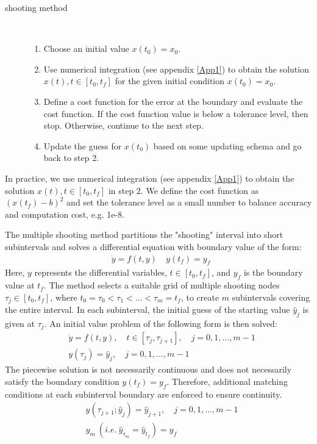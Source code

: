\documentclass  [
  paper    = a4,
  BCOR     = 10mm,
  twoside,
  fontsize = 12pt,
  fleqn,
  toc      = bibnumbered,
  toc      = listofnumbered,
  numbers  = noendperiod,
  headings = normal,
  listof   = leveldown,
  version  = 3.03
]                                       {scrreprt}
\newcommand{\<}{\langle}
\renewcommand{\>}{\rangle}
\begin{document}
\begin{description}
	\item[shooting method] \
	\begin{enumerate}
		\item Choose an initial value $x(t_0)=x_0$.
		\item Use numerical integration (see appendix \ref{App1}) to obtain the solution $x(t), t \in [t_0, t_f]$ for the given initial condition $x(t_0)=x_0$.
		\item Define a cost function for the error at the boundary and evaluate the cost function. If the cost function value is below a tolerance level, then stop. Otherwise, continue to the next step.
		\item Update the guess for $x(t_0)$ based on some updating schema and go back to step 2.
	\end{enumerate}
\end{description}
In practice, we use numerical integration (see appendix \ref{App1}) to obtain the solution $x(t), t \in [t_0, t_f]$ in step 2. We define the cost function as $(x(t_f)-b)^2$ and set the tolerance level as a small number to balance accuracy and computation cost, e.g. 1e-8.

The multiple shooting method partitions the "shooting" interval into short subintervals and solves a differential equation with boundary value of the form:
\begin{equation}\label{eqn:ori_dae}
	\begin{aligned}
		& \dot{y} = f(t, y) \
		& y(t_f) = y_f \
	\end{aligned}
\end{equation}
Here, $y$ represents the differential variables, $t \in [t_0, t_f]$, and $y_f$ is the boundary value at $t_f$. The method selects a suitable grid of multiple shooting nodes $\tau_j \in [t_0,t_f]$, where $t_0 = \tau_0 < \tau_1 < ... < \tau_m = t_f$, to create $m$ subintervals covering the entire interval. In each subinterval, the initial guess of the starting value $\hat{y}_j$ is given at $\tau_j$. An initial value problem of the following form is then solved:
\begin{equation}\label{eqn:msh}
	\begin{aligned}
		& \dot{y} = f(t, y), \quad t \in [\tau_j, \tau_{j+1}], \quad j = 0, 1, ..., m-1  \\
		& y(\tau_j) = \hat{y}_j, \quad j = 0, 1, ..., m-1 \
	\end{aligned}
\end{equation}
The piecewise solution is not necessarily continuous and does not necessarily satisfy the boundary condition $y(t_f) = y_f$. Therefore, additional matching conditions at each subinterval boundary are enforced to ensure continuity.
\begin{equation}\label{eqn:mc}
	\begin{aligned}
		& y(\tau_{j+1}; \hat{y}_j) = \hat{y}_{j+1}, \quad j = 0, 1, ..., m-1 \\
		& \hat{y}_{m} \ (i.e. \ \hat{y}_{\tau_m} = \hat{y}_{t_f}) = y_f \
	\end{aligned}
\end{equation}
\end{document}

